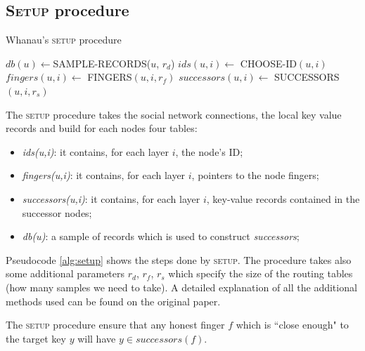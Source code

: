 \subsection{\textsc{Setup} procedure}
\begin{algorithm} %
\caption{Whanau's \textsc{setup} procedure} %
\label{alg:setup} %
\begin{algorithmic}[1] %
        \STATE $db(u) \gets $\textsc{SAMPLE-RECORDS}($u$, $r_d$)
    \ENDFOR
            \STATE $ids(u, i) \gets$ \textsc{CHOOSE-ID}$(u,i)$
            \STATE $fingers(u, i) \gets$ \textsc{FINGERS}$(u,i, r_f)$
            \STATE $successors(u, i) \gets$ \textsc{SUCCESSORS}$(u,i, r_s)$
        \ENDFOR
    \ENDFOR
\end{algorithmic}
\end{algorithm}

The \textsc{setup} procedure takes the social network connections, the local key value records and build for each nodes four tables:
\begin{itemize}
    \item \textit{ids(u,i)}: it contains, for each layer $i$, the node's ID; 
    \item \textit{fingers(u,i)}: it contains, for each layer $i$, pointers to the node fingers;
    \item \textit{successors(u,i)}: it contains, for each layer $i$, key-value records contained in the successor nodes;
    \item \textit{db(u)}: a sample of records which is used to construct \textit{successors};
\end{itemize}
Pseudocode \ref{alg:setup} shows the steps done by \textsc{setup}. The procedure takes also some additional parameters $r_d$, $r_f$, $r_s$ which specify the size of the routing tables (how many samples we need to take). A detailed explanation of all the additional methods used can be found on the original paper.

The \textsc{setup} procedure ensure that any honest finger $f$ which is ``close enough" to the target key $y$ will have $y \in successors(f)$.


